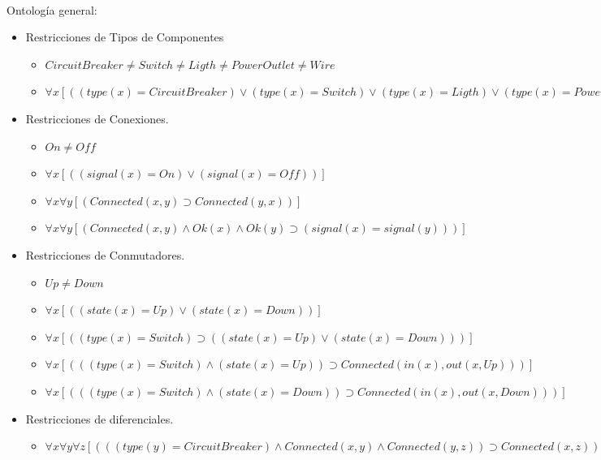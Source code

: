 \documentclass[10pt, a4paper,spanish]{article}
\begin{document}
		\paragraph{}
		Ontología general:
		\begin{itemize}

			\item Restricciones de Tipos de Componentes
			\begin{itemize}
				\item $ CircuitBreaker \neq Switch\neq Ligth \neq PowerOutlet \neq Wire   $
				\item $ \forall x [((type(x) = CircuitBreaker) \lor (type(x) = Switch) \lor (type(x) = Ligth) \lor (type(x) = PowerOutlet) \lor (type(x) = Wire))] $
			\end{itemize}
			\item Restricciones de Conexiones.
			\begin{itemize}
				\item $ On \neq Off $
				\item $ \forall x [((signal(x) = On) \lor (signal(x) = Off))] $
				\item $ \forall x \forall y [(Connected(x, y) \supset Connected(y, x))] $
				\item $ \forall x \forall y [(Connected(x, y) \land Ok(x) \land Ok(y) \supset (signal(x) = signal(y)))] $
			\end{itemize}

			\item Restricciones de Conmutadores.
			\begin{itemize}
				\item $ Up \neq Down $
				\item $ \forall x [((state(x) = Up) \lor (state(x) = Down))] $
				\item $ \forall x [( (type(x) = Switch) \supset ((state(x) = Up) \lor (state(x) = Down)))] $
				\item $ \forall x [( ( (type(x) = Switch) \land (state(x) = Up) ) \supset Connected(in(x), out(x, Up)))] $
				\item $ \forall x [( ( (type(x) = Switch) \land (state(x) = Down) ) \supset Connected(in(x), out(x, Down)))] $
			\end{itemize}

			\item Restricciones de diferenciales.
			\begin{itemize}
				\item $ \forall x \forall y \forall z [( ((type(y) = CircuitBreaker) \land Connected(x, y) \land Connected(y, z) ) \supset Connected(x, z))] $
			\end{itemize}


\end{itemize}
\end{document}

